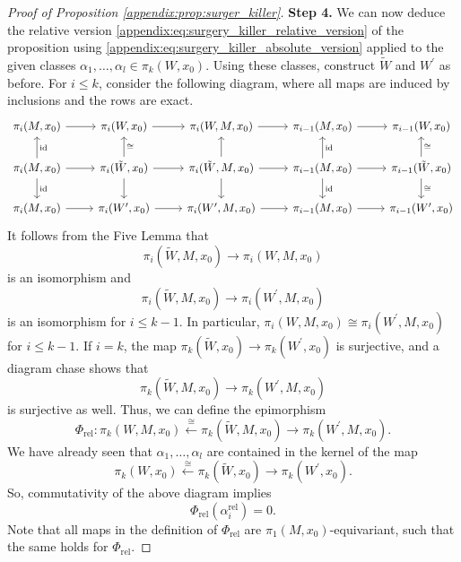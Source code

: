 \begin{proof}[Proof of Proposition \ref{appendix:prop:surger_killer}]
    \noindent \textbf{Step 4.} We can now deduce the relative version \ref{appendix:eq:surgery_killer_relative_version} of the proposition using \ref{appendix:eq:surgery_killer_absolute_version} applied to the given classes $\alpha_1, \ldots, \alpha_l \in \pi_k(W,x_0)$. Using these classes, construct $\tilde{W}$ and $W^\prime$ as before. For $i \leq k$, consider the following diagram, where all maps are induced by inclusions and the rows are exact. 
    \[\begin{tikzcd}
	{\pi_i(M,x_0)} & {\pi_i(W,x_0)} & {\pi_i(W,M,x_0)} & {\pi_{i-1}(M,x_0)} & {\pi_{i-1}(W,x_0)} \\
	{\pi_i(M,x_0)} & {\pi_i(\tilde{W},x_0)} & {\pi_i(\tilde{W},M,x_0)} & {\pi_{i-1}(M,x_0)} & {\pi_{i-1}(\tilde{W},x_0)} \\
	{\pi_i(M,x_0)} & {\pi_i(W^\prime,x_0)} & {\pi_i(W^\prime,M,x_0)} & {\pi_{i-1}(M,x_0)} & {\pi_{i-1}(W^\prime,x_0)}
	\arrow[from=1-1, to=1-2]
	\arrow[from=1-2, to=1-3]
	\arrow[from=1-3, to=1-4]
	\arrow[from=1-4, to=1-5]
	\arrow["{\mathrm{id}}"', from=2-1, to=1-1]
	\arrow[from=2-1, to=2-2]
	\arrow["{\mathrm{id}}", from=2-1, to=3-1]
	\arrow["\cong"', from=2-2, to=1-2]
	\arrow[from=2-2, to=2-3]
	\arrow[from=2-2, to=3-2]
	\arrow[from=2-3, to=1-3]
	\arrow[from=2-3, to=2-4]
	\arrow[from=2-3, to=3-3]
	\arrow["{\mathrm{id}}"', from=2-4, to=1-4]
	\arrow[from=2-4, to=2-5]
	\arrow["{\mathrm{id}}", from=2-4, to=3-4]
	\arrow["\cong"', from=2-5, to=1-5]
	\arrow["\cong", from=2-5, to=3-5]
	\arrow[from=3-1, to=3-2]
	\arrow[from=3-2, to=3-3]
	\arrow[from=3-3, to=3-4]
	\arrow[from=3-4, to=3-5]
    \end{tikzcd}\]
    It follows from the Five Lemma that 
    \[
    \pi_i(\tilde{W},M,x_0) \to \pi_i(W,M,x_0)
    \] 
    is an isomorphism and 
    \[
    \pi_i(\tilde{W},M,x_0) \to \pi_i(W^\prime,M,x_0)
    \] 
    is an isomorphism for $i \leq k-1$. In particular, $\pi_i(W,M,x_0) \cong \pi_i(W^\prime,M,x_0)$ for \linebreak $i \leq k-1$. If $i = k$, the map $\pi_k(\tilde{W},x_0) \to \pi_k(W^\prime,x_0)$ is surjective, and a diagram chase shows that 
    \[
    \pi_k(\tilde{W},M,x_0) \to \pi_k(W^\prime,M,x_0)
    \] 
    is surjective as well. Thus, we can define the epimorphism
    \[
    \Phi_\mathrm{rel} \colon \pi_k(W,M,x_0) \xleftarrow{\cong} \pi_k(\tilde{W},M,x_0) \to \pi_k(W^\prime,M,x_0).
    \]
    We have already seen that $\alpha_1,\ldots,\alpha_l$ are contained in the kernel of the map 
    \[
    \pi_k(W,x_0) \xleftarrow{\cong} \pi_k(\tilde{W},x_0) \to \pi_k(W^\prime,x_0).
    \]
    So, commutativity of the above diagram implies 
    \[
    \Phi_\mathrm{rel}(\alpha_i^\mathrm{rel}) = 0.
    \]
    Note that all maps in the definition of $\Phi_\mathrm{rel}$ are $\pi_1(M,x_0)$-equivariant, such that the same holds for $\Phi_\mathrm{rel}$.
\end{proof}


